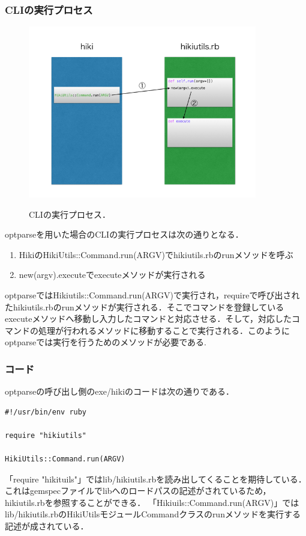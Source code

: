 \subsubsection{CLIの実行プロセス}
\begin{figure}[htbp]\begin{center}
\includegraphics[width=10cm,bb= 0 0 737 553]{../figs/./hikiutils_yamane.007.jpg}
\caption{CLIの実行プロセス．}
\label{fig:007}
\label{default}\end{center}\end{figure}
optparseを用いた場合のCLIの実行プロセスは次の通りとなる．

\begin{enumerate}
\item HikiのHikiUtils::Command.run(ARGV)でhikiutils.rbのrunメソッドを呼ぶ
\item new(argv).executeでexecuteメソッドが実行される
\end{enumerate}
optparseではHikiutils::Command.run(ARGV)で実行され，requireで呼び出されたhikiutils.rbのrunメソッドが実行される．そこでコマンドを登録しているexecuteメソッドへ移動し入力したコマンドと対応させる．そして，対応したコマンドの処理が行われるメソッドに移動することで実行される．このようにoptparseでは実行を行うためのメソッドが必要である.

\subsubsection{コード}
optparseの呼び出し側のexe/hikiのコードは次の通りである．
\begin{lstlisting}[style=customRuby,basicstyle={\scriptsize\ttfamily}]
#!/usr/bin/env ruby                                                             

require "hikiutils"

HikiUtils::Command.run(ARGV)
\end{lstlisting}
「require "hikituils"」ではlib/hikiutils.rbを読み出してくることを期待している．
これはgemspecファイルでlibへのロードパスの記述がされているため，hikiutils.rbを参照することができる．
「Hikiuils::Command.run(ARGV)」ではlib/hikiutils.rbのHikiUtilsモジュールCommandクラスのrunメソッドを実行する記述が成されている．

